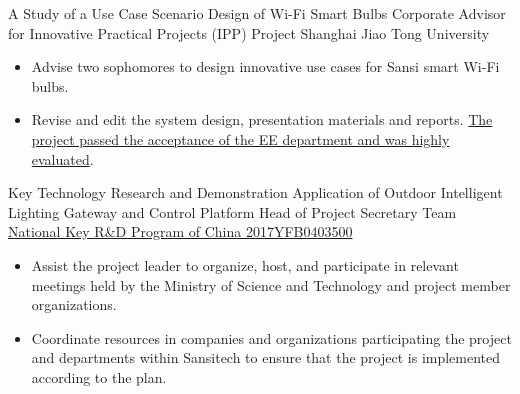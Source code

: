 \documentclass[11pt,a4paper]{moderncv/moderncv}
\begin{document}
{A Study of a Use Case Scenario Design of Wi-Fi Smart Bulbs}
{Corporate Advisor for Innovative Practical Projects (IPP) Project}
{Shanghai Jiao Tong University}{}
{
\begin{itemize}
	\item Advise two sophomores to design innovative use cases for Sansi smart Wi-Fi bulbs.
	\item Revise and edit the system design, presentation materials and reports. \href{https://bingcheng1998.github.io/zh-CN/制作/sansi全彩灯泡的app设计.html}{The project passed the acceptance of the EE department and was highly evaluated}.
\end{itemize}
}

{Key Technology Research and Demonstration Application of Outdoor Intelligent Lighting Gateway and Control Platform}
{Head of Project Secretary Team}
{\href{http://service.most.gov.cn/u/cms/static/201706/05145323ywhn.pdf}{National Key R\&D Program of China 2017YFB0403500}}{}
{
\begin{itemize}
	\item Assist the project leader to organize, host, and participate in relevant meetings held by the Ministry of Science and Technology and project member organizations.
	\item Coordinate resources in companies and organizations participating the project and departments within Sansitech to ensure that the project is implemented according to the plan.
\end{itemize}
}


\end{document}
